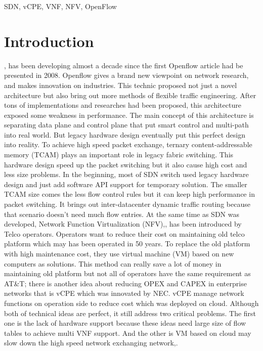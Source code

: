 \documentclass[journal]{IEEEtran}
\begin{document}
\begin{IEEEkeywords}
SDN, vCPE, VNF, NFV, OpenFlow
\end{IEEEkeywords}

\IEEEpeerreviewmaketitle{}


\section{Introduction}
\cite{sdn-new-norm}, \cite{sdn-comprehensive} has been developing almost a decade since the first Openflow article had be presented in 2008\cite{openflow-campus-network}. Openflow\cite{sp:openflow13} gives a brand new viewpoint on network research, and makes innovation on industries. This technic proposed not just a novel architecture but also bring out more methods of flexible traffic engineering. After tons of implementations and researches had been proposed, this architecture exposed some weakness in performance. The main concept of this architecture is separating data plane and control plane that put smart control and multi-path into real world. But legacy hardware design eventually put this perfect design into reality. To achieve high speed packet exchange, ternary content-addressable memory (TCAM) plays an important role in legacy fabric switching. This hardware design speed up the packet switching but it also cause high cost and less size problems.
In the beginning, most of SDN switch used legacy hardware design and just add software API support for temporary solution. The smaller TCAM size comes the less flow control rules but it can keep high performance in packet switching. It brings out inter-datacenter dynamic traffic routing because that scenario doesn’t need much flow entries.
At the same time as SDN was developed, Network Function Virtualization (NFV)\cite{nfvwp},\cite{nfv-survey},\cite{laptop-sdn} has been introduced by Telco operators. Operators want to reduce their cost on maintaining old telco platform which may has been operated in 50 years. To replace the old platform with high maintenance cost, they use virtual machine (VM) based on new computers as solutions. This method can really save a lot of money in maintaining old platform but not all of operators have the same requirement as AT\&T; there is another idea about reducing OPEX and CAPEX in enterprise networks that is vCPE which was innovated by NEC\cite{nec-vcpe}. vCPE manage network functions on operation side to reduce cost which was deployed on cloud. Although both of technical ideas are perfect, it still address two critical problems. The first one is the lack of hardware support because these ideas need large size of flow tables to achieve multi VNF support. And the other is VM based on cloud may slow down the high speed network exchanging network\cite{nfv-placemet},\cite{nfv-placement-model}.
\end{document}
